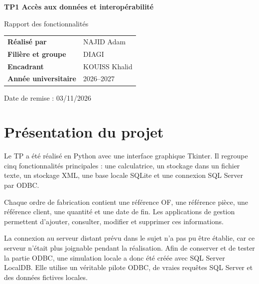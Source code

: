 \documentclass[11pt,a4paper]{article}
\begin{document}
\hypersetup{pageanchor=false}
\begin{titlepage}
  \thispagestyle{empty}
  \centering
  \vspace*{1.4cm}

  \vspace{2.2cm}
  {\Huge\bfseries\color{primary} TP1 Accès aux données et interopérabilité\par}
  \vspace{0.5cm}
  {\LARGE Rapport des fonctionnalités\par}
  \vspace{2.4cm}

  \begin{tabular}{>{\bfseries}p{4.2cm}p{8.5cm}}
    Réalisé par & NAJID Adam \\
    Filière et groupe & DIAGI \\
    Encadrant & KOUISS Khalid \\
    Année universitaire & 2026--2027 \\
  \end{tabular}

  \vfill
  {\large Date de remise : 03/11/2026\par}
\end{titlepage}

\hypersetup{pageanchor=true}
\setcounter{tocdepth}{1}
\tableofcontents
\clearpage
{}

\section{Présentation du projet}

Le TP a été réalisé en Python avec une interface graphique Tkinter. Il regroupe cinq fonctionnalités principales : une calculatrice, un stockage dans un fichier texte, un stockage XML, une base locale SQLite et une connexion SQL Server par ODBC.

Chaque ordre de fabrication contient une référence OF, une référence pièce, une référence client, une quantité et une date de fin. Les applications de gestion permettent d'ajouter, consulter, modifier et supprimer ces informations.

La connexion au serveur distant prévu dans le sujet n'a pas pu être établie, car ce serveur n'était plus joignable pendant la réalisation. Afin de conserver et de tester la partie ODBC, une simulation locale a donc été créée avec SQL Server LocalDB. Elle utilise un véritable pilote ODBC, de vraies requêtes SQL Server et des données fictives locales.
\end{document}
